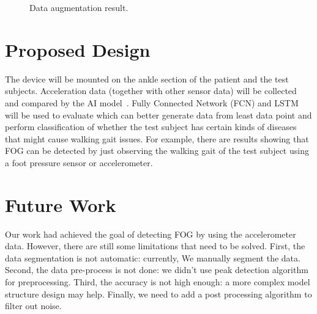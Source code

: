 \documentclass[10pt,twocolumn,letterpaper]{article}
\begin{document}
\begin{figure}[t]
    \centering
    \caption{Data augmentation result.}
    \label{fig:f16}
\end{figure}

\section{Proposed Design}
\label{sec:design}

    The device will be mounted on the ankle section of the patient and the test subjects. Acceleration data (together with other sensor data) will be collected and compared by the AI model~\cite{10.1007/978-3-319-59147-6_30}. Fully Connected Network (FCN) and LSTM will be used to evaluate which can better generate data from least data point and perform classification of whether the test subject has certain kinds of diseases that might cause walking gait issues. For example, there are results showing that FOG can be detected by just observing the walking gait of the test subject using a foot pressure sensor or accelerometer.

\section{Future Work}
\label{sec:future_work}

    Our work had achieved the goal of detecting FOG by using the accelerometer data. However, there are still some limitations that need to be solved. First, the data segmentation is not automatic: currently, We manually segment the data. Second, the data pre-process is not done: we didn't use peak detection algorithm for preprocessing. Third, the accuracy is not high enough: a more complex model structure design may help. Finally, we need to add a post processing algorithm to filter out noise.
    
\end{document}
